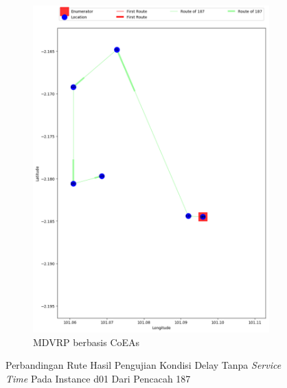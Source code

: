 \begin{figure}[H]
	\centering
	\begin{subfigure}[t]{\textwidth}
		\centering
		\includegraphics[width=\textwidth]{Resources/Images/delayed_1/real_m15_n100_delayed_1_187_coes}
		\caption{MDVRP berbasis CoEAs}
		\label{fig:real_m15_n100_delayed_1_187_coes}
	\end{subfigure}
	\caption{Perbandingan Rute Hasil Pengujian Kondisi Delay Tanpa \textit{Service Time} Pada Instance d01 Dari Pencacah 187}
	\label{fig:real_m15_n100_delayed_1_187}
\end{figure}


